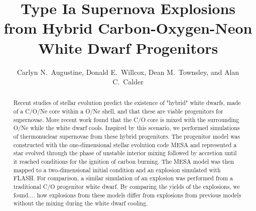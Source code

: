 \documentclass[iop,apj]{emulateapj}
\begin{document}
\title{Type Ia Supernova Explosions from Hybrid Carbon-Oxygen-Neon White Dwarf Progenitors}

\author{
Carlyn N.\ Augustine,
Donald E.\ Willcox,
Dean M.\ Townsley,
and Alan C.\ Calder
}


\begin{abstract}
Recent studies of stellar evolution predict the existence of "hybrid" white 
dwarfs, made of a C/O/Ne
core within a O/Ne shell, and that these are viable progenitors for supernovae.
More recent work found that the C/O core is mixed with the surrounding O/Ne
while the white dwarf cools. Inspired by this scenario, we performed simulations of
thermonuclear supernovae from these hybrid progenitors. The progenitor model 
was constructed with the one-dimensional stellar evolution code MESA and
represented a star evolved through the phase of unstable interior mixing 
followed by accretion until it reached conditions for the ignition of 
carbon burning. The MESA model was then mapped to a two-dimensional initial 
condition and an explosion simulated with FLASH. For comparison, a similar
simulation of an explosion was performed from a traditional C/O progenitor
white dwarf. By comparing the yields of the explosions, we found....
how explosions from these models differ from explosions from previous models
without the mixing during the white dwarf cooling.
\end{abstract}


\end{document}
